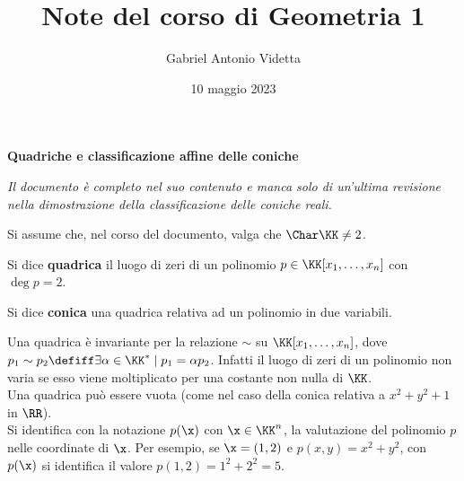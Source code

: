 \documentclass[11pt]{article}
\title{\textbf{Note del corso di Geometria 1}}
\author{Gabriel Antonio Videtta}
\date{10 maggio 2023}
\begin{document}
	
	\maketitle
	
	\begin{center}
		\Large \textbf{Quadriche e classificazione affine delle coniche}
	\end{center}
	
	\begin{center}\textit{Il documento è completo nel suo contenuto e manca solo di un'ultima revisione nella dimostrazione della classificazione delle coniche reali.}\end{center}
	
	\begin{note}
		Si assume che, nel corso del documento, valga che $\Char \KK \neq 2$.
	\end{note}
	
	\begin{definition}[quadriche] Si dice \textbf{quadrica} il luogo di zeri
		di un polinomio $p \in \KK[x_1, \ldots, x_n]$ con $\deg p = 2$.
	\end{definition}
	
	\begin{definition}[coniche] Si dice \textbf{conica} una quadrica relativa ad un polinomio
		in due variabili.
	\end{definition}
	
	\begin{remark}\nl
		\li Una quadrica è invariante per la relazione $\sim$ su $\KK[x_1, \ldots, x_n]$, dove
		$p_1 \sim p_2 \defiff \exists \alpha \in \KK^* \mid p_1 = \alpha p_2$. Infatti
		il luogo di zeri di un polinomio non varia se esso viene moltiplicato per una costante non nulla di $\KK$. \\
		\li Una quadrica può essere vuota (come nel caso della conica relativa a $x^2 + y^2 + 1$ in $\RR$). \\
		\li Si identifica con la notazione $p(\x)$ con $\x \in \KK^n$, la valutazione del polinomio $p$ nelle coordinate
		di $\x$. Per esempio, se $\x = (1, 2)$ e $p(x, y) = x^2 + y^2$, con $p(\x)$ si identifica il valore
		$p(1, 2) = 1^2 + 2^2 = 5$.
	\end{remark}
	
\end{document}
